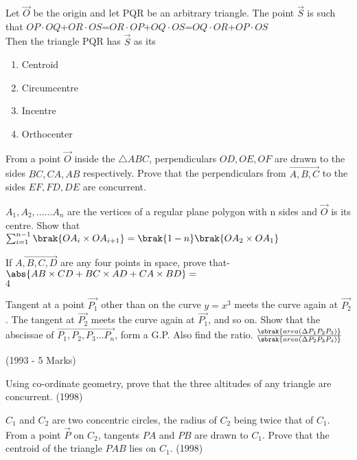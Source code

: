          \item %
		 Let $\vec{O}$ be the origin and let PQR be an arbitrary triangle. The point $\vec{S}$ is such that $OP\cdot OQ$+$OR\cdot OS$=$OR\cdot OP$+$OQ\cdot OS$=$OQ\cdot OR$+$OP\cdot OS$\\
Then the triangle PQR has $\vec{S}$ as its \hfill{}\\
\begin{enumerate}
        \item Centroid                             
        \item Circumcentre                           
        \item Incentre            
        \item Orthocenter\\          
\end{enumerate}
\item From a point $\vec{O}$ inside the $\triangle ABC$, perpendiculars $OD, OE, OF$ are drawn to the sides $BC, CA, AB$ respectively. Prove that the perpendiculars from $\vec{A,B,C}$ to the sides $EF, FD, DE$ are concurrent. \hfill{}
	\item $A_1,A_2,......A_n$ are the vertices of a regular plane polygon with n sides and $\vec{O}$ is its centre. Show that
	$\sum_{i=1}^{n-1}\brak{OA_i\times OA_{i+1}}= \brak{1-n}\brak{OA_2\times OA_1}$
		\hfill{}\\
	\item If $\vec{A,B,C,D}$ are any four points in space, prove that-
		$\abs{AB\times CD+ BC\times AD+CA\times BD}=$\\ $4$  \hfill{}\\
	\item Tangent at a point $\vec{P_{1}}$ {other than } on the curve $y=x^{3}$ meets the curve again at $\vec{P_{2}}$. The tangent at $\vec{P_{2}}$ meets the curve again at $\vec{P_{1}}$, and so on. Show that the abscissae of $\vec{P_{1}, P_{2}, P_{3} \dots P_{n}}$, form a G.P. Also find the ratio. $\frac{\sbrak{area(\Delta P_{1}P_{2}P_{3})}}{\sbrak{area(\Delta P_{2}P_{3}P_{4})}}$

	\hfill{(1993 - 5 Marks)}
\item Using co-ordinate geometry, prove that the three altitudes of any triangle are concurrent.
	\hfill{(1998)}
\item $C_{1}$ and $C_{2}$ are two concentric circles,  the radius of $C_{2}$ being twice that of $C_{1}$. From a point $\vec{P}$ on $C_{2}$,  tangents $PA$ and $PB$ are drawn to $C_{1}$. Prove that the centroid of the triangle $PAB$ lies on $C_{1}$.
	           \hfill(1998)
